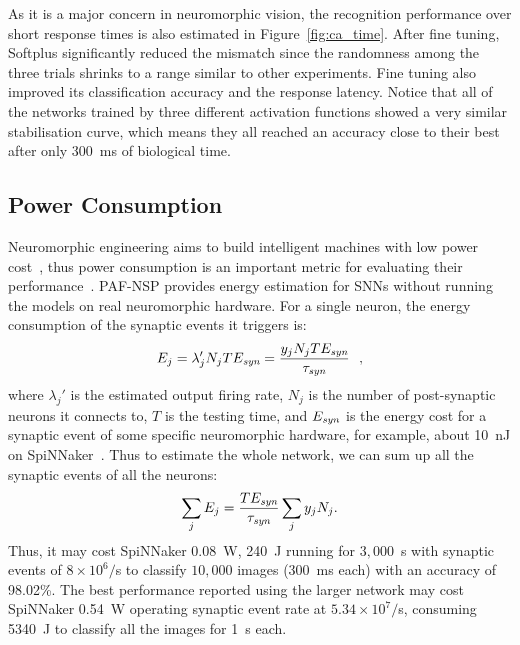 \documentclass{article}
\begin{document}
	As it is a major concern in neuromorphic vision, the recognition performance over short response times is also estimated in Figure~\ref{fig:ca_time}.
	After fine tuning, Softplus significantly reduced the mismatch since the randomness among the three trials shrinks to a range similar to other experiments.
	Fine tuning also improved its classification accuracy and the response latency.
	Notice that all of the networks trained by three different activation functions showed a very similar stabilisation curve, which means they all reached an accuracy close to their best after only 300~ms of biological time. 
	
	
	\subsection{Power Consumption}
	Neuromorphic engineering aims to build intelligent machines with low power cost~\cite{furber2016large}, thus power consumption is an important metric for evaluating their performance~\cite{liu2016bench}.
	PAF-NSP provides energy estimation for SNNs without running the models on real neuromorphic hardware.
	For a single neuron, the energy consumption of the synaptic events it triggers is:
	\begin{equation}
	E_{j} = \lambda_j' N_j T E_{\textit{\textrm{syn}}} = \dfrac{y_j N_j T E_{\textit{\textrm{syn}}}}{\tau_{\textit{\textrm{syn}}}}~~,
	\label{equ:energy}
	\end{equation}
	where $\lambda_j'$ is the estimated output firing rate, $N_j$ is the number of post-synaptic neurons it connects to, $T$ is the testing time, and $E_{\textit{\textrm{syn}}}$ is the energy cost for a synaptic event of some specific neuromorphic hardware, for example, about 10~nJ on SpiNNaker~\cite{furber2016large}.
	Thus to estimate the whole network, we can sum up all the synaptic events of all the neurons:
	\begin{equation}
	\sum_j E_{j} =  \dfrac{T E_{\textit{\textrm{\textit{\textrm{syn}}}}}}{\tau_{\textit{\textrm{syn}}}} \sum_{j}y_j N_j.
	\end{equation}
	Thus, it may cost SpiNNaker 0.08~W, 240~J running for $3,000$~s with synaptic events of $8\times10^6/$s to classify $10,000$ images (300~ms each) with an accuracy of 98.02\%.
	The best performance reported using the larger network may cost SpiNNaker 0.54~W operating synaptic event rate at $5.34\times10^7/$s, consuming 5340~J to classify all the images for 1~s each.
	
\end{document}
